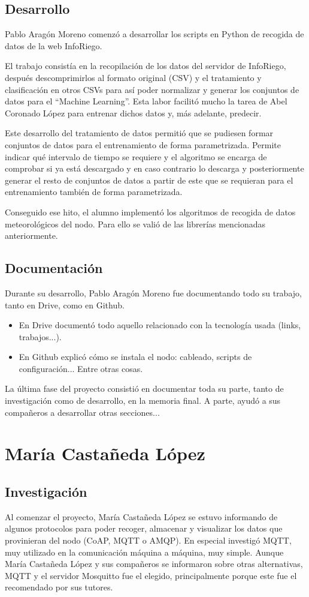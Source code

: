 \subsection{Desarrollo}
Pablo Aragón Moreno comenzó a desarrollar los scripts en Python de recogida de datos de la web InfoRiego.

El trabajo consistía en la recopilación de los datos del servidor de InfoRiego, después descomprimirlos al formato original (CSV) y el tratamiento y clasificación en otros CSVs para así poder normalizar y generar los conjuntos de datos para el ``Machine Learning''. Esta labor facilitó mucho la tarea de Abel Coronado López para entrenar dichos datos y, más adelante, predecir.

Este desarrollo del tratamiento de datos permitió que se pudiesen formar conjuntos de datos para el entrenamiento de forma parametrizada. Permite indicar qué intervalo de tiempo se requiere y el algoritmo se encarga de comprobar si ya está descargado y en caso contrario lo descarga y posteriormente generar el resto de conjuntos de datos a partir de este que se requieran para el entrenamiento también de forma parametrizada.

Conseguido ese hito, el alumno implementó los algoritmos de recogida de datos meteorológicos del nodo. Para ello se valió de las librerías mencionadas anteriormente.

\subsection{Documentación}
Durante su desarrollo, Pablo Aragón Moreno fue documentando todo su trabajo, tanto en Drive, como en Github.
\begin{itemize}
\item En Drive documentó todo aquello relacionado con la tecnología usada (links, trabajos...).
\item En Github explicó cómo se instala el nodo: cableado, scripts de configuración... Entre otras cosas. 
\end{itemize}
La última fase del proyecto consistió en documentar toda su parte, tanto de investigación como de desarrollo, en la memoria final. A parte, ayudó a sus compañeros a desarrollar otras secciones... 

\section{María Castañeda López}
\subsection{Investigación}
Al comenzar el proyecto, María Castañeda López se estuvo informando de algunos protocolos para poder recoger, almacenar y visualizar los datos que provinieran del nodo (CoAP, MQTT o AMQP). En especial investigó MQTT, muy utilizado en la comunicación máquina a máquina, muy simple. Aunque María Castañeda López y sus compañeros se informaron sobre otras alternativas, MQTT y el servidor Mosquitto fue el elegido, principalmente porque este fue el recomendado por sus tutores. 

